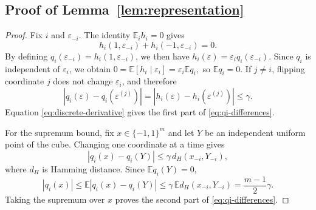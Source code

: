 \documentclass[11pt]{article}
\newcommand{\E}{\mathbb{E}}
\newcommand{\abs}[1]{\left\lvert #1\right\rvert}
\begin{document}
\subsection{Proof of Lemma~\ref{lem:representation}} \label{proof: lem-representation} 
\begin{proof}
Fix $i$ and $\varepsilon_{-i}$. The identity $\E_i h_i=0$ gives
\[
h_i(1,\varepsilon_{-i}) + h_i(-1,\varepsilon_{-i}) = 0.
\]
By defining $q_i(\varepsilon_{-i})=h_i(1,\varepsilon_{-i})$, we then have \(h_i(\varepsilon) = \varepsilon_iq_i(\varepsilon_{-i}).\)
Since $q_i$ is independent of $\varepsilon_i$, we obtain $0 = \E[h_i\mid\varepsilon_i] = \varepsilon_i\E q_i,$
so $\E q_i=0$. If $j\neq i$, flipping coordinate $j$ does not change $\varepsilon_i$, and therefore
\[
\abs{q_i(\varepsilon)-q_i(\varepsilon^{(j)})}
=
\abs{h_i(\varepsilon)-h_i(\varepsilon^{(j)})}
\le
\gamma.
\]
Equation \eqref{eq:discrete-derivative} gives the first part of \eqref{eq:qi-differences}.

For the supremum bound, fix $x\in\{-1,1\}^m$ and let $Y$ be an independent uniform point of the cube. Changing one coordinate at a time gives
\[
\abs{q_i(x)-q_i(Y)} \le \gamma\,d_H(x_{-i},Y_{-i}),
\]
where $d_H$ is Hamming distance. Since $\E q_i(Y)=0$,
\[
\abs{q_i(x)} \le \E\abs{q_i(x)-q_i(Y)} \le
\gamma\,\E d_H(x_{-i},Y_{-i}) = \frac{m-1}{2}\gamma.
\]
Taking the supremum over $x$ proves the second part of \eqref{eq:qi-differences}. 
\end{proof}
\end{document}
